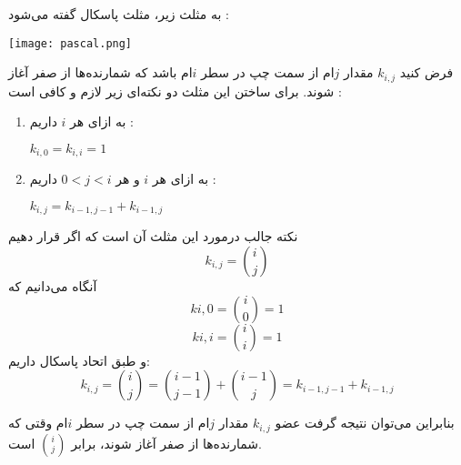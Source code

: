 
به مثلث زیر، مثلث پاسکال گفته می‌شود :

\begin{center}
  \texttt{[image: pascal.png]}
\end{center}

فرض کنید
$k_{i,j}$
مقدار 
$j$ام
از سمت چپ در سطر
$i$ام
باشد که شمارنده‌ها از صفر آغاز شوند. برای ساختن این مثلث دو نکته‌ای زیر لازم و کافی است :
\begin{enumerate}
  \item 
  به ازای هر
  $i$
  داریم :
  \begin{center}
    $k_{i,0} = k_{i,i} = 1$
  \end{center}

  \item 
  به ازای هر 
  $i$ و هر
  $0 < j < i$
  داریم :
  \begin{center}
    $k_{i,j} = k_{i-1,j-1} + k_{i-1,j}$
  \end{center}
\end{enumerate}

نکته جالب درمورد این مثلث آن است که اگر قرار دهیم
$$k_{i,j} = {i \choose j}$$
آنگاه می‌دانیم که
$$k{i,0} = {i \choose 0} = 1$$
$$k{i,i} = {i \choose i} = 1$$
و طبق اتحاد پاسکال داریم:
$$k_{i,j} = {i \choose j} = {i-1 \choose j-1} + {i-1 \choose j} = k_{i-1,j-1} + k_{i-1,j}$$

بنابراین می‌توان نتیجه گرفت عضو
$k_{i,j}$
مقدار 
$j$ام
از سمت چپ در سطر
$i$ام
وقتی که شمارنده‌ها از صفر آغاز شوند، برابر 
$i \choose j$
است.
